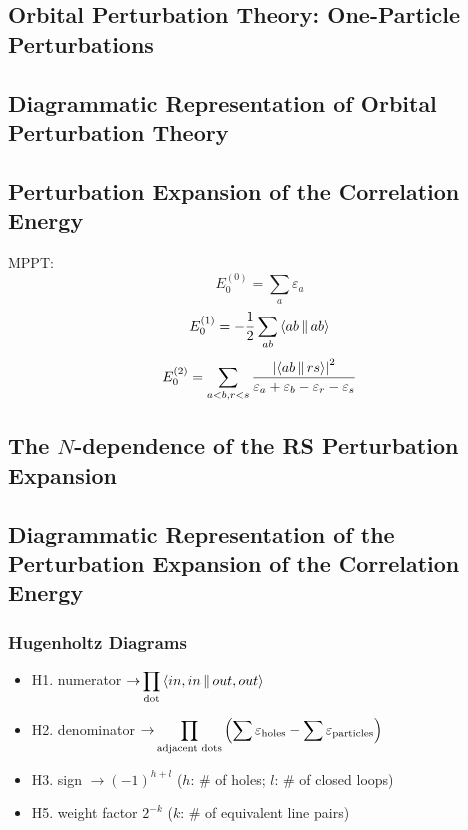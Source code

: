 \documentclass[a4paper]{article}
\DeclareMathOperator{\ra}{\rightarrow}
\newcommand{\dis}{\displaystyle}
\numberwithin{equation}{section}
\begin{document}
\subsection{Orbital Perturbation Theory: One-Particle Perturbations}

\subsection{Diagrammatic Representation of Orbital Perturbation Theory}

\subsection{Perturbation Expansion of the Correlation Energy}
MPPT:
\begin{equation}\label{key}
E_0^{(0)} = \sum_a \varepsilon_a
\end{equation}
\begin{equation}\label{key}
E_0^{(1)} = -\dfrac{1}{2}\sum_{ab} \Braket{ab||ab}
\end{equation}
\begin{align}
E_0^{(2)} = %
\sum_{a<b,r<s} \dfrac{\abs{\Braket{ab||rs}}^2}{\varepsilon_a + \varepsilon_b - \varepsilon_r - \varepsilon_s}
\end{align}

\subsection{The $ N $-dependence of the RS Perturbation Expansion}

\subsection{Diagrammatic Representation of the Perturbation Expansion of the Correlation Energy}
\subsubsection{Hugenholtz Diagrams}
\begin{itemize}
	\item H1. numerator  $\ra \dis\prod_{\text{dot}}\Braket{in,in || out,out} $
	\item H2. denominator $\ra \dis\prod_{\text{adjacent dots}}\qty(\sum \varepsilon_{\text{holes}} - \sum \varepsilon_{\text{particles}})  $
	\item H3. sign $ \ra (-1)^{h+l} $ ($ h $: \# of holes; $ l $: \# of closed loops)
	\item H5. weight factor $ 2^{-k} $ ($ k $: \# of equivalent line pairs)
\end{itemize}
\end{document}
